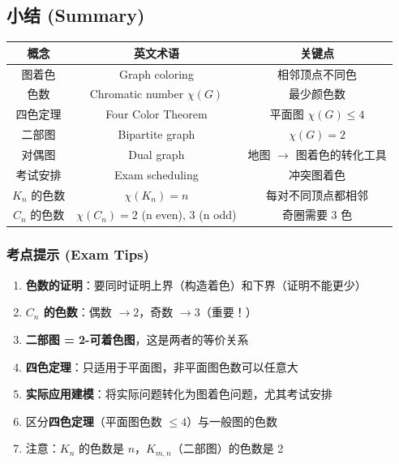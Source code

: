 \documentclass[10pt,a4paper,openany]{ctexbook}
\theoremstyle{definition}
\theoremstyle{remark}
\begin{document}
\vspace{-2pt}

\subsection{小结 (Summary)}

\begin{center}
\begin{tabular}{ccc}
\hline
概念 & 英文术语 & 关键点 \\ \hline
图着色 & Graph coloring & 相邻顶点不同色 \\
色数 & Chromatic number $\chi(G)$ & 最少颜色数 \\
四色定理 & Four Color Theorem & 平面图 $\chi(G) \le 4$ \\
二部图 & Bipartite graph & $\chi(G) = 2$ \\
对偶图 & Dual graph & 地图 $\to$ 图着色的转化工具 \\
考试安排 & Exam scheduling & 冲突图着色 \\
$K_n$ 的色数 & $\chi(K_n) = n$ & 每对不同顶点都相邻 \\
$C_n$ 的色数 & $\chi(C_n) = 2$ (n even), $3$ (n odd) & 奇圈需要 3 色 \\
\hline
\end{tabular}

\end{center}

\subsubsection{考点提示 (Exam Tips)}

\begin{enumerate}
\item \textbf{色数的证明}：要同时证明上界（构造着色）和下界（证明不能更少）
\item \textbf{$C_n$ 的色数}：偶数 $\to 2$，奇数 $\to 3$（重要！）
\item \textbf{二部图 = 2-可着色图}，这是两者的等价关系
\item \textbf{四色定理}：只适用于平面图，非平面图色数可以任意大
\item \textbf{实际应用建模}：将实际问题转化为图着色问题，尤其考试安排
\item 区分\textbf{四色定理}（平面图色数 $\le 4$）与一般图的色数
\item 注意：$K_n$ 的色数是 $n$，$K_{m,n}$（二部图）的色数是 2

\end{enumerate}
\end{document}
